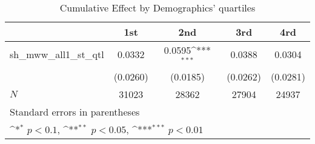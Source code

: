 \begin{table}[htbp]\centering
\def\sym#1{\ifmmode^{#1}\else\(^{#1}\)\fi}
\caption{Cumulative Effect by Demographics' quartiles}
\begin{tabular}{l*{4}{c}}
\hline\hline
            &\multicolumn{1}{c}{1st}&\multicolumn{1}{c}{2nd}&\multicolumn{1}{c}{3rd}&\multicolumn{1}{c}{4rd}\\
\hline
sh\_mww\_all1\_st\_qtl&      0.0332         &      0.0595\sym{***}&      0.0388         &      0.0304         \\
            &    (0.0260)         &    (0.0185)         &    (0.0262)         &    (0.0281)         \\
\hline
\(N\)       &       31023         &       28362         &       27904         &       24937         \\
\hline\hline
\multicolumn{5}{l}{\footnotesize Standard errors in parentheses}\\
\multicolumn{5}{l}{\footnotesize \sym{*} \(p<0.1\), \sym{**} \(p<0.05\), \sym{***} \(p<0.01\)}\\
\end{tabular}
\end{table}
